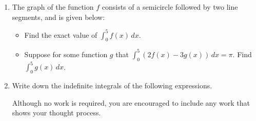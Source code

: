 \documentclass[11pt]{article}
\begin{document}
\begin{enumerate}
\item[\textbf{I2.}]
The graph of the function $f$ consists of a semicircle followed by two line segments, and is given below:

\begin{center}
\end{center}

\begin{itemize}

    
\item[(a)] Find the exact value of $\displaystyle\int_0^5 f(x)\,dx$.
    \vfill
    
\item[(b)] Suppose for some function $g$ that $\displaystyle\int_0^5 (2f(x)-3g(x))\,dx=\pi$. Find $\displaystyle\int_0^5 g(x)\,dx$.
    \vfill
    
\end{itemize}
\newpage

\item[\textbf{I3.}]
Write down the indefinite integrals of the following expressions. 

Although no work is required, you are encouraged to include any work that shows your thought process. 



\end{enumerate}
\end{document}
